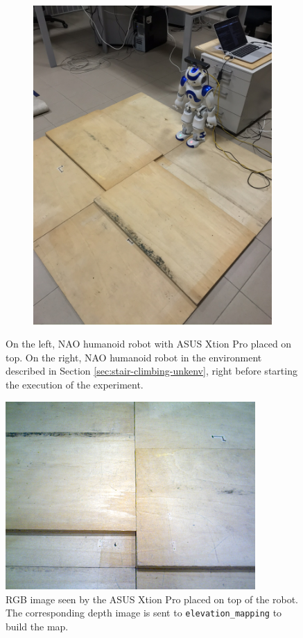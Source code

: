\begin{figure}
\begin{subfigure}[b]{0.49\textwidth}
    \includegraphics[width=\textwidth]{figures/NAO-with-xtion-full-env.JPEG}
    \caption{}
    \label{fig:nao-with-xtion-full-env}
  \end{subfigure}
  \caption{On the left, NAO humanoid robot with ASUS Xtion Pro placed on top.
      On the right, NAO humanoid robot in the environment described in
			Section \ref{sec:stair-climbing-unkenv}, 
      right before starting the execution of the experiment.}
\end{figure}
\begin{figure}
  \centering
  \includegraphics[width=0.85\textwidth]{figures/xtion_rgb_20cm.png}
  \caption{RGB image seen by the ASUS Xtion Pro placed on top of the robot.
      The corresponding depth image is sent to \texttt{elevation\_mapping}
      to build the map.}
  \label{fig:xtion-rgb-20cm}
\end{figure}
